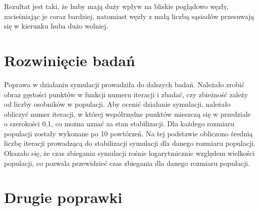 \documentclass{wfiisul}
\begin{document}
Rezultat jest taki, że huby mają duży wpływ na bliskie poglądowo węzły, zacieśniając je coraz bardziej, natomiast węzły z małą liczbą sąsiadów przesuwają się w kierunku huba dużo wolniej. 

\section{Rozwinięcie badań}

Poprawa w działaniu symulacji prowadziła do dalszych badań. Należało zrobić obraz gęstości punktów w funkcji numeru iteracji i zbadać, czy zbieżność zależy od liczby osobników w populacji. 
Aby ocenić działanie symulacji, należało obliczyć numer iteracji, w której współrzędne punktów mieszczą się w przedziale o szerokości 0,1, co można uznać za stan stabilizacji. 
Dla każdego rozmiaru populacji zostały wykonane po 10 powtórzeń. Na tej podstawie obliczono średnią liczbę iteracji prowadzącą do stabilizacji symulacji dla danego rozmiaru populacji. 
Okazało się, że czas zbiegania symulacji rośnie logarytmicznie względem wielkości populacji, co pozwala przewidzieć czas zbiegania dla danego rozmiaru populacji. 

\section{Drugie poprawki}
\end{document}
